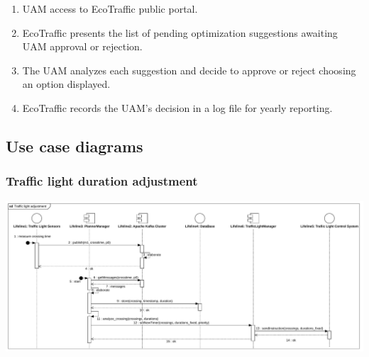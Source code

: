 \documentclass[12pt, a4paper, twoside, openright]{report}
\begin{document}
\begin{enumerate}
\item
  UAM access to EcoTraffic public portal.
\item
  EcoTraffic presents the list of pending optimization suggestions awaiting UAM approval or rejection.
\item
  The UAM analyzes each suggestion and decide to approve or reject
  choosing an option displayed.
\item
  EcoTraffic records the UAM's decision in a log file for yearly reporting.
\end{enumerate}

\subsection{Use case diagrams}
\subsubsection{Traffic light duration adjustment}

\includegraphics[width=\linewidth]{images/svg/traffic_light_adjustment.pdf}

\end{document}
